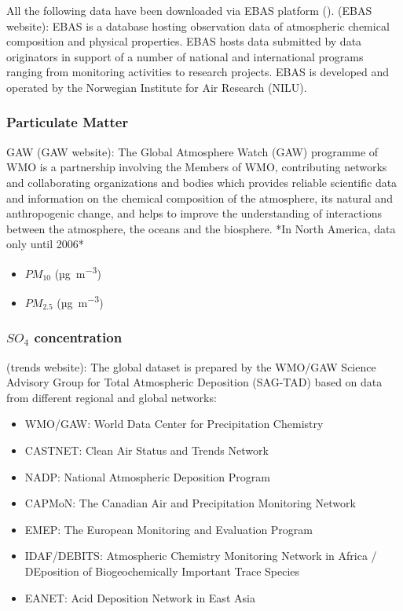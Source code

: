 \documentclass[journal abbreviation, manuscript]{copernicus}
\begin{document}
All the following data have been downloaded via EBAS platform (\cite{ebasweb}).
(EBAS website): EBAS is a database hosting observation data of atmospheric chemical composition and physical properties. EBAS hosts data submitted by data originators in support of a number of national and international programs ranging from monitoring activities to research projects. EBAS is developed and operated by the Norwegian Institute for Air Research (NILU).

\subsubsection{Particulate Matter}
GAW (GAW website): The Global Atmosphere Watch (GAW) programme of WMO is a partnership involving the Members of WMO, contributing networks and collaborating organizations and bodies which provides reliable scientific data and information on the chemical composition of the atmosphere, its natural and anthropogenic change, and helps to improve the understanding of interactions between the atmosphere, the oceans and the biosphere.
*In North America, data only until 2006*
\begin{itemize}
 \item $PM_{10}$ (\unit{µg.m^{-3}})
 \item $PM_{2.5}$ (\unit{µg.m^{-3}})
\end{itemize}

\subsubsection{$SO_{4}$ concentration}
(trends website): The global dataset is prepared by the WMO/GAW Science Advisory Group for Total Atmospheric Deposition (SAG-TAD) based on data from different regional and global networks:
\begin{itemize}
 \item WMO/GAW: World Data Center for Precipitation Chemistry
 \item CASTNET: Clean Air Status and Trends Network
 \item NADP: National Atmospheric Deposition Program
 \item CAPMoN: The Canadian Air and Precipitation Monitoring Network
 \item EMEP: The European Monitoring and Evaluation Program
 \item IDAF/DEBITS: Atmospheric Chemistry Monitoring Network in Africa / DEposition of Biogeochemically Important Trace Species
 \item EANET: Acid Deposition Network in East Asia
\end{itemize}
\end{document}
